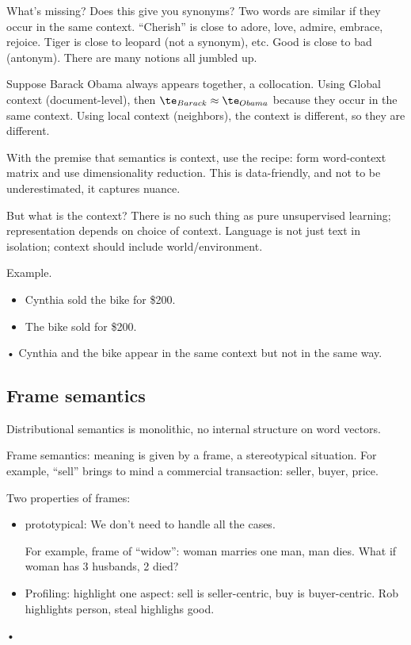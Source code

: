 What's missing? Does this give you synonyms? Two words are similar if they occur in the same context. ``Cherish'' is close to adore, love, admire, embrace, rejoice. Tiger is close to leopard (not a synonym), etc. Good is close to bad (antonym). There are many notions all jumbled up. 

Suppose Barack Obama always appears together, a collocation. %
Using Global context (document-level), then $\te_{Barack} \approx \te_{Obama}$ because they occur in the same context.
 Using local context (neighbors), the context is different, so they are different.
 
 With the premise that semantics is context, use the recipe: form word-context matrix and use dimensionality reduction. This is data-friendly, and not to be underestimated, it captures nuance.
 
But what is the context? There is no such thing as pure unsupervised learning; representation depends on choice of context. Language is not just text in isolation; context should include world/environment.

Example.
\begin{itemize}
\item
Cynthia sold the bike for \$200.
\item
The bike sold for \$200.
\end{itemize}•
Cynthia and the bike appear in the same context but not in the same way.
\subsection{Frame semantics}

Distributional semantics is monolithic, no internal structure on word vectors. 

Frame semantics: meaning is given by a frame, a stereotypical situation. For example, ``sell'' brings to mind a commercial transaction: seller, buyer, price.

Two properties of frames:
\begin{itemize}
\item
prototypical: We don't need to handle all the cases.

For example, frame of ``widow'': woman marries one man, man dies. What if woman has 3 husbands, 2 died?
\item
Profiling: highlight one aspect: sell is seller-centric, buy is buyer-centric. Rob highlights person, steal highlighs good.
\end{itemize}•

